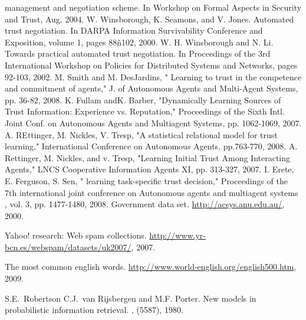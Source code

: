 \documentclass{llncs}
\begin{document}
\begin{thebibliography}{99.}
management and negotiation scheme. In Workshop on 
Formal Aspects in Security and Trust, Aug. 2004.
 W. Winsborough, K. Seamons, and V. Jones. Automated
trust negotiation. In DARPA Information Survivability Conference
and Exposition, volume 1, pages 88ñ102, 2000.
 W. H. Winsborough and N. Li. Towards practical automated
trust negotiation. In Proceedings of the 3rd International
Workshop on Policies for Distributed Systems and
Networks, pages 92-103, 2002.
 M. Smith and M. DesJardins, " Learning to trust in the competence and commitment of agents," J. of 	Autonomous Agents and Multi-Agent Systems, pp. 36-82, 2008. 
 K. Fullam andK. Barber, "Dynamically Learning Sources of Trust Information: Experience vs. Reputation," Proceedings of the Sixth Intl. Joint Conf. on Autonomous Agents and Multiagent Systems, pp. 1062-1069, 2007.
 A. REttinger, M. Nickles, V. Tresp, "A statistical relational model for trust learning," International Conference on Autonomous Agents,  pp.763-770, 2008. 
 A. Rettinger, M. Nickles, and v. Tresp,  "Learning Initial Trust Among Interacting Agents," LNCS Cooperative Information Agents XI, pp. 313-327, 2007.
 I. Erete, E. Ferguson, S. Sen, " learning task-specific trust decision," Proceedings of the 7th international joint conference on Autonomous agents and multiagent systems , vol. 3,  pp. 1477-1480, 2008.
Government data set.
\newblock \url{http://acsys.anu.edu.au/}, 2000.

Yahoo! research: Web spam collections.
\newblock \url{http://www.yr-bcn.es/webspam/datasets/uk2007/}, 2007.

The most common english words.
\newblock \url{http://www.world-english.org/english500.htm}, 2009.

S.E.~Robertson C.J.~van Rijsbergen and M.F. Porter.
\newblock New models in probabilistic information retrieval.
, (5587), 1980.


\end{thebibliography}
\end{document}
